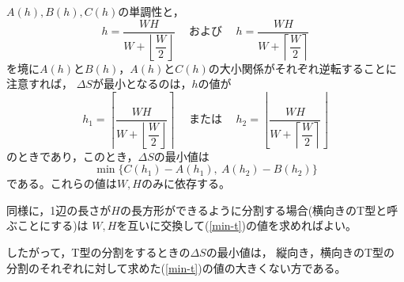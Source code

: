 \documentclass{article}
\begin{document}
$A(h), B(h), C(h)$の単調性と，
\begin{equation*}
    h = \dfrac{WH}{ W + \left\lfloor \dfrac{W}{2} \right\rfloor }
    \hspace{15pt} \mbox{および} \hspace{15pt}
    h = \dfrac{WH}{ W + \left\lceil  \dfrac{W}{2} \right\rceil }
\end{equation*}
を境に$A(h)$と$B(h)$，$A(h)$と$C(h)$の大小関係がそれぞれ逆転することに注意すれば，
$\Delta S$が最小となるのは，$h$の値が
\begin{equation*}
    h_1 =
    \left\lceil
        \dfrac{WH}{ W + \left\lfloor \dfrac{W}{2} \right\rfloor }
    \right\rceil
    \hspace{15pt} \mbox{または} \hspace{15pt}
    h_2 =
    \left\lfloor
        \dfrac{WH}{ W + \left\lceil  \dfrac{W}{2} \right\rceil }
    \right\rfloor
\end{equation*}
のときであり，このとき，$\Delta S$の最小値は
\begin{equation}
    \label{min-t}
    \min \{ C(h_1) - A(h_1),\ A(h_2) - B(h_2) \}
\end{equation}
である。これらの値は$W, H$のみに依存する。

同様に，1辺の長さが$H$の長方形ができるように分割する場合(横向きのT型と呼ぶことにする)は
$W, H$を互いに交換して(\ref{min-t})の値を求めればよい。

したがって，T型の分割をするときの$\Delta S$の最小値は，
縦向き，横向きのT型の分割のそれぞれに対して求めた(\ref{min-t})の値の大きくない方である。
\end{document}
